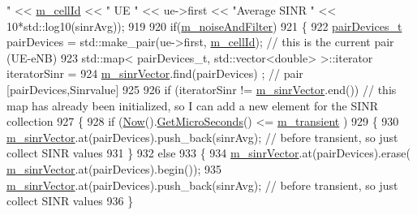 \begin{DoxyCode}
{       "} << \hyperlink{classns3_1_1MmWavePhy_a0594531da45f93220d4f5de292bae823}{m\_cellId} << \textcolor{stringliteral}{" UE "} << ue->first << \textcolor{stringliteral}{"Average SINR "} << 10*std::log10(sinrAvg));
919 
920                 \textcolor{keywordflow}{if}(\hyperlink{classns3_1_1MmWaveEnbPhy_adc49fae3719fbc3f8bfed9b49b04a6c6}{m\_noiseAndFilter})
921                 \{
922                         \hyperlink{namespacens3_abe460b1ad735ce7c8e408857371b87af}{pairDevices\_t} pairDevices = std::make\_pair(ue->first, 
      \hyperlink{classns3_1_1MmWavePhy_a0594531da45f93220d4f5de292bae823}{m\_cellId}); \textcolor{comment}{// this is the current pair (UE-eNB)}
923                         std::map< pairDevices\_t, std::vector<double> >::iterator iteratorSinr =
924                                                                  \hyperlink{classns3_1_1MmWaveEnbPhy_a9e1e37ef62d54fbfc28bfd829e78f239}{m\_sinrVector}.find(pairDevices)
      ; \textcolor{comment}{// pair [pairDevices,Sinrvalue] }
925 
926                         \textcolor{keywordflow}{if} (iteratorSinr != \hyperlink{classns3_1_1MmWaveEnbPhy_a9e1e37ef62d54fbfc28bfd829e78f239}{m\_sinrVector}.end()) \textcolor{comment}{// this map has already been
       initialized, so I can add a new element for the SINR collection}
927                         \{
928                                 \textcolor{keywordflow}{if} (\hyperlink{group__simulator_gac3635e2e87f7ce316c89290ee1b01d0d}{Now}().\hyperlink{classns3_1_1Time_a2542b9273c336da11fcaf54e8bc6e4c8}{GetMicroSeconds}() <= 
      \hyperlink{classns3_1_1MmWaveEnbPhy_a60467889c9c76cba890f049098f4a822}{m\_transient} )
929                                 \{
930                                         \hyperlink{classns3_1_1MmWaveEnbPhy_a9e1e37ef62d54fbfc28bfd829e78f239}{m\_sinrVector}.at(pairDevices).push\_back(sinrAvg); \textcolor{comment}{//
       before transient, so just collect SINR values}
931                                 \}
932                                 \textcolor{keywordflow}{else}
933                                 \{       
934                                         \hyperlink{classns3_1_1MmWaveEnbPhy_a9e1e37ef62d54fbfc28bfd829e78f239}{m\_sinrVector}.at(pairDevices).erase(
      \hyperlink{classns3_1_1MmWaveEnbPhy_a9e1e37ef62d54fbfc28bfd829e78f239}{m\_sinrVector}.at(pairDevices).begin());
935                                         \hyperlink{classns3_1_1MmWaveEnbPhy_a9e1e37ef62d54fbfc28bfd829e78f239}{m\_sinrVector}.at(pairDevices).push\_back(sinrAvg); \textcolor{comment}{//
       before transient, so just collect SINR values}
936                                 \}

\end{DoxyCode}

